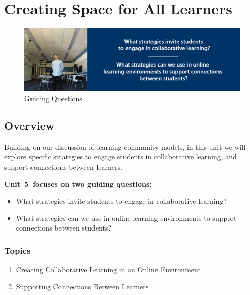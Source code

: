 \documentclass[
]{book}
\providecommand{\tightlist}{%
  \setlength{\itemsep}{0pt}\setlength{\parskip}{0pt}}
\begin{document}
\hypertarget{creating-space-for-all-learners}{%
\chapter{Creating Space for All Learners}\label{creating-space-for-all-learners}}

\begin{figure}
\centering
\includegraphics{assets/unit5/LDRS664-BannerUnit5.jpg}
\caption{Guiding Questions}
\end{figure}

\hypertarget{overview-4}{%
\section*{Overview}\label{overview-4}}

Building on our discussion of learning community models, in this unit we will explore specific strategies to engage students in collaborative learning, and support connections between learners.

\textbf{Unit~5~focuses on two guiding questions:}

\begin{itemize}
\tightlist
\item
  What strategies invite students to engage in collaborative learning?\\
\item
  What strategies can we use in online learning environments to support connections between students?
\end{itemize}

\hypertarget{topics-4}{%
\subsection*{Topics}\label{topics-4}}

\begin{enumerate}
\def\labelenumi{\arabic{enumi}.}
\tightlist
\item
  Creating Collaborative Learning in an Online Environment\\
\item
  Supporting Connections Between Learners
\end{enumerate}
\end{document}
